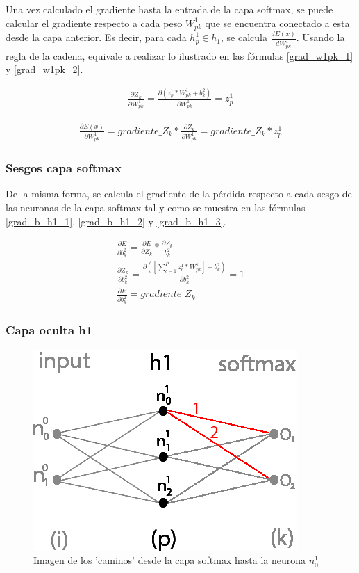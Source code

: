 Una vez calculado el gradiente hasta la entrada de la capa softmax, se puede calcular el gradiente respecto a cada peso $W^1_{pk}$ que se encuentra conectado a esta desde la capa anterior. Es decir, para cada $h^1_p\in h_1$, se calcula $\frac{dE(x)}{dW^1_{pk}}$. Usando la regla de la cadena, equivale a realizar lo ilustrado en las fórmulas \ref{grad_w1pk_1} y \ref{grad_w1pk_2}.

\begin{gather}
	\frac{\partial Z_k}{\partial W^1_{pk}} = \frac{\partial (z^1_p * W^1 _{pk}+ b^2_k)}{\partial W^1_{pk }} = z^1_p
	\label{grad_w1pk_1}
\end{gather}

\begin{gather}
	\frac{\partial E(x)}{\partial W^1_{pk }} =  gradiente\_Z_k * \frac{\partial Z_k}{\partial W^1_{pk }} = gradiente\_Z_k * z^1_p
	\label{grad_w1pk_2}
\end{gather}

\subsubsection{Sesgos capa softmax}

De la misma forma, se calcula el gradiente de la pérdida respecto a cada sesgo de las neuronas de la capa softmax tal y como se muestra en las fórmulas \ref{grad_b_h1_1}, \ref{grad_b_h1_2} y \ref{grad_b_h1_3}.

\begin{gather}
	\frac{\partial E}{\partial b^2_k} = \frac{\partial E}{\partial Z_k} * \frac{\partial Z_k}{b^2_k} \label{grad_b_h1_1} \\
	\frac{\partial Z_k }{\partial b^2_k } = \frac{\partial ([\sum_{c=1}^{P} z^1_c * W^1_{pk}] + b^2_k) }{\partial b^2_k } = 1 \label{grad_b_h1_2} \\
	\frac{\partial E}{\partial b^2_k} = gradiente\_Z_k \label{grad_b_h1_3}
\end{gather}

\subsubsection{Capa oculta h1}

\begin{figure}[H]
	\centering
	\includegraphics[scale=0.35]{imagenes/nn_caminos_posibles.jpg}  
	\caption{Imagen de los 'caminos' desde la capa softmax hasta la neurona $n^1_0$}
	\label{nn_caminos_posibles}
\end{figure}

